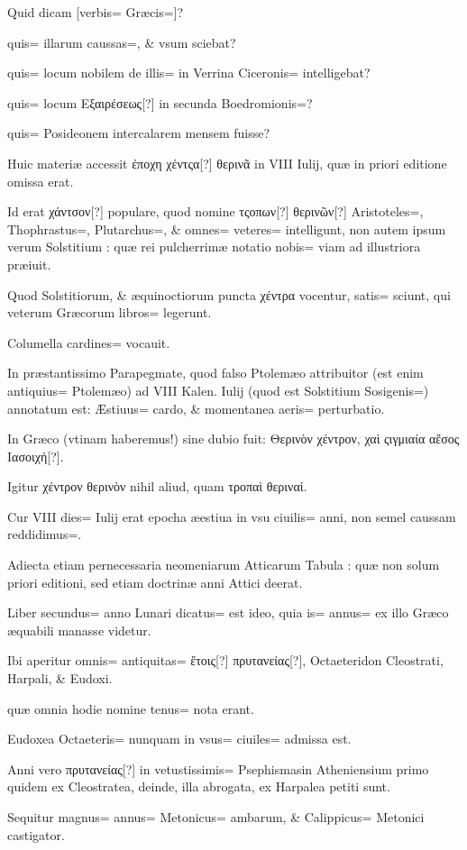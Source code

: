 \begin{parnumbers}
Quid dicam [verbis= Græcis=]?

quis= illarum caussas=, \& vsum sciebat?

quis= locum nobilem de illis= in Verrina Ciceronis= intelligebat?

quis= locum Εξαιρέσεως[?] in secunda Boedromionis=?

quis= Posideonem intercalarem mensem fuisse?

Huic materiæ accessit ἐποχη χέντςα[?] θερινᾶ in VIII Iulij, quæ in priori editione omissa erat.

Id erat χάντσον[?] populare, quod nomine τςοπων[?] θερινῶν[?] Aristoteles=, Thophrastus=, Plutarchus=, \& omnes= veteres= intelligunt, non autem ipsum verum Solstitium : quæ rei pulcherrimæ notatio nobis= viam ad illustriora præiuit.

Quod Solstitiorum, \& æquinoctiorum puncta χέντρα vocentur, satis= sciunt, qui veterum Græcorum libros= legerunt.

Columella cardines= vocauit.

In præstantissimo Parapegmate, quod falso Ptolemæo attribuitor (est enim antiquius= Ptolemæo) ad VIII Kalen. Iulij (quod est Solstitium Sosigenis=) annotatum est: Æstiuus= cardo, \& momentanea aeris= perturbatio.

In Græco (vtinam haberemus!) sine dubio fuit: Θερινὸν χέντρον, χαὶ ςιγμιαία αἔσος Ιασοιχή[?].

Igitur χέντρον θερινὸν nihil aliud, quam τροπαὶ θεριναί.

Cur VIII dies= Iulij erat epocha æestiua in vsu ciuilis= anni, non semel caussam reddidimus=. 

Adiecta etiam pernecessaria neomeniarum Atticarum Tabula : quæ non solum priori editioni, sed etiam doctrinæ anni Attici deerat.

Liber secundus= anno Lunari dicatus= est ideo, quia is= annus= ex illo Græco æquabili manasse videtur.

Ibi aperitur omnis= antiquitas= ἔτοις[?] πρυτανείας[?], Octaeteridon Cleostrati, Harpali, \& Eudoxi.

quæ omnia hodie nomine tenus= nota erant.

Eudoxea Octaeteris= nunquam in vsus= ciuiles= admissa est.

Anni vero πρυτανείας[?] in vetustissimis= Psephismasin Atheniensium primo quidem ex Cleostratea, deinde, illa abrogata, ex Harpalea petiti sunt.

Sequitur magnus= annus= Metonicus= ambarum, \& Calippicus= Metonici castigator.


\end{parnumbers}
